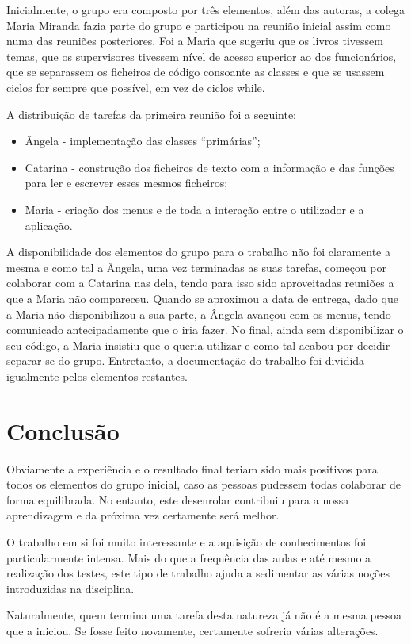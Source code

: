 \documentclass[12pt,a4paper,reqno]{report}
\numberwithin{figure}{section}
\numberwithin{equation}{section}
\begin{document}
Inicialmente, o grupo era composto por três elementos, além das autoras, a colega Maria Miranda fazia parte do grupo e participou na reunião inicial assim como numa das reuniões posteriores. Foi a Maria que sugeriu que os livros tivessem temas, que os supervisores tivessem nível de acesso superior ao dos funcionários, que se separassem os ficheiros de código consoante as classes e que se usassem ciclos for sempre que possível, em vez de ciclos while.

A distribuição de tarefas da primeira reunião foi a seguinte:
\begin{itemize}
	\item Ângela - implementação das classes ``primárias'';
	\item Catarina - construção dos ficheiros de texto com a informação e das funções para ler e escrever esses mesmos ficheiros;
	\item Maria - criação dos menus e de toda a interação entre o utilizador e a aplicação.
\end{itemize}

A disponibilidade dos elementos do grupo para o trabalho não foi claramente a mesma e como tal a Ângela, uma vez terminadas as suas tarefas, começou por colaborar com a Catarina nas dela, tendo para isso sido aproveitadas reuniões a que a Maria não compareceu. Quando se aproximou a data de entrega, dado que a Maria não disponibilizou a sua parte, a Ângela avançou com os menus, tendo comunicado antecipadamente que o iria fazer. No final, ainda sem disponibilizar o seu código, a Maria insistiu que o queria utilizar e como tal acabou por decidir separar-se do grupo. Entretanto, a documentação do trabalho foi dividida igualmente pelos elementos restantes.

\chapter{Conclusão}

Obviamente a experiência e o resultado final teriam sido mais positivos para todos os elementos do grupo inicial, caso as pessoas pudessem todas colaborar de forma equilibrada. No entanto, este desenrolar contribuiu para a nossa aprendizagem e da próxima vez certamente será melhor.

O trabalho em si foi muito interessante e a aquisição de conhecimentos foi particularmente intensa. Mais do que a frequência das aulas e até mesmo a realização dos testes, este tipo de trabalho ajuda a sedimentar as várias noções introduzidas na disciplina.

Naturalmente, quem termina uma tarefa desta natureza já não é a mesma pessoa que a iniciou. Se fosse feito novamente, certamente sofreria várias alterações.
\end{document}
